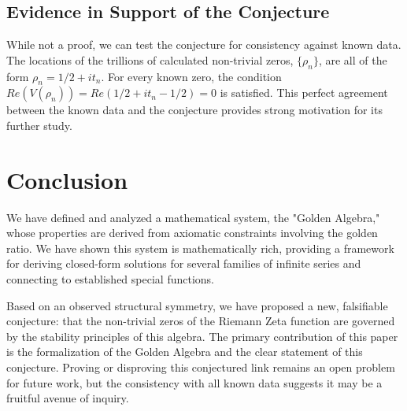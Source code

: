 \documentclass[12pt, letterpaper]{article}
\begin{document}
\subsection{Evidence in Support of the Conjecture}
While not a proof, we can test the conjecture for consistency against known data. The locations of the trillions of calculated non-trivial zeros, $\{\rho_{n}\}$, are all of the form $\rho_{n} = 1/2 + it_n$. For every known zero, the condition $Re(V(\rho_n)) = Re(1/2 + it_n - 1/2) = 0$ is satisfied. This perfect agreement between the known data and the conjecture provides strong motivation for its further study.

\section{Conclusion}
We have defined and analyzed a mathematical system, the "Golden Algebra," whose properties are derived from axiomatic constraints involving the golden ratio. We have shown this system is mathematically rich, providing a framework for deriving closed-form solutions for several families of infinite series and connecting to established special functions.

Based on an observed structural symmetry, we have proposed a new, falsifiable conjecture: that the non-trivial zeros of the Riemann Zeta function are governed by the stability principles of this algebra. The primary contribution of this paper is the formalization of the Golden Algebra and the clear statement of this conjecture. Proving or disproving this conjectured link remains an open problem for future work, but the consistency with all known data suggests it may be a fruitful avenue of inquiry.
\end{document}
